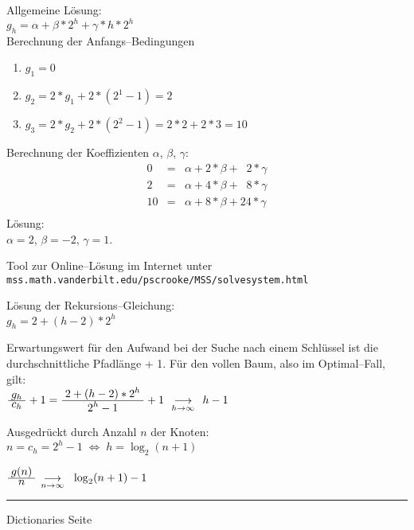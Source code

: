 \begin{slide}{}
\normalsize

\footnotesize
Allgemeine L\"osung: \\[0.3cm]
\hspace*{1.3cm} $g_h = \alpha + \beta * 2^h + \gamma * h * 2^h$ \\[0.3cm]
Berechnung der Anfangs--Bedingungen
\begin{enumerate}
\item $g_1 = 0$
\item $g_2 = 2 * g_1 + 2 * (2^1 - 1) = 2$
\item $g_3 = 2 * g_2 + 2 * (2^2 - 1) = 2 * 2 + 2 * 3 = 10$
\end{enumerate}
Berechnung der Koeffizienten $\alpha$, $\beta$, $\gamma$:
$$
\begin{array}{rcl}
  0 & = & \alpha + 2 * \beta + \;\;2 * \gamma \\
  2 & = & \alpha + 4 * \beta + \;\;8 * \gamma \\
 10 & = & \alpha + 8 * \beta + 24 * \gamma \\
\end{array}
$$
L\"osung: \\[0.3cm]
\hspace*{1.3cm}  $\alpha = 2$, $\beta = -2$, $\gamma = 1$.

Tool zur Online--L\"osung im Internet unter \\[0.3cm]
\hspace*{0.3cm} \texttt{mss.math.vanderbilt.edu/pscrooke/MSS/solvesystem.html}



L\"osung der Rekursions--Gleichung: \\[0.3cm]
\hspace*{1.3cm} $g_h = 2 + (h-2) * 2^{h}$ 

Erwartungswert f\"ur den Aufwand bei der Suche nach einem Schl\"ussel ist die durchschnittliche Pfadl\"ange + 1.
F\"ur den vollen Baum, also im Optimal--Fall, gilt: \\[0.3cm]
\hspace*{1.3cm} $\frac{\displaystyle\;g_h\;}{\displaystyle\;c_h\;} + 1 = \frac{\displaystyle\;2 + (h-2) * 2^{h}\;}{\displaystyle\;2^{h} -1\;} + 1\;\; _{\displaystyle \longrightarrow \atop {\scriptstyle h \rightarrow \infty}} \;\; h - 1$

Ausgedr\"uckt durch Anzahl $n$ der Knoten: \\[0.3cm]
\hspace*{1.3cm} $n = c_h = 2^h -1 \;\Leftrightarrow\; h = \log_2(n + 1)$

\hspace*{1.3cm} $\frac{\displaystyle\;g(n)\;}{\displaystyle\;n\;}\;  _{\displaystyle \longrightarrow \atop {\scriptstyle n \rightarrow \infty}} \;\; \log_2(n + 1) - 1$


\vspace*{\fill}
\tiny \addtocounter{mypage}{1}
\rule{17cm}{1mm}
Dictionaries  \hspace*{\fill} Seite 
\end{slide}

